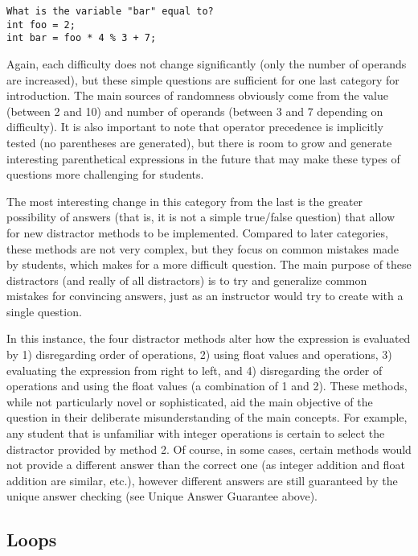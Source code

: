 \documentclass{article}
\begin{document}
\begin{lstlisting}
What is the variable "bar" equal to? 
int foo = 2; 
int bar = foo * 4 % 3 + 7; 
\end{lstlisting}

Again, each difficulty does not change significantly (only the number of operands are increased), but these simple questions are sufficient for one last category for introduction.
The main sources of randomness obviously come from the value (between 2 and 10) and number of operands (between 3 and 7 depending on difficulty). It is also important to note that
operator precedence is implicitly tested (no parentheses are generated), but there is room to grow and generate interesting parenthetical expressions in the future that may make
these types of questions more challenging for students. 

The most interesting change in this category from the last is the greater possibility of answers (that is, it is not a simple true/false question) that allow for new distractor methods to be implemented. Compared to later categories, these methods are not very complex, but they focus on common mistakes made by students, which makes for a more difficult question. The main
purpose of these distractors (and really of all distractors) is to try and generalize common mistakes for convincing answers, just as an instructor would try to create with a single question. 

In this instance, the four distractor methods alter how the expression is evaluated by 1) disregarding order of operations, 2) using float values and operations, 3) evaluating the expression from
right to left, and 4) disregarding the order of operations and using the float values (a combination of 1 and 2). These methods, while not particularly novel or sophisticated, aid the main objective 
of the question in their deliberate misunderstanding of the main concepts. For example, any student that is unfamiliar with integer operations is certain to select the distractor provided by method 2. Of course, in some cases, certain methods would not provide a different answer than the correct one (as integer addition and float addition are similar, etc.), however different answers are still guaranteed by the unique answer checking (see Unique Answer Guarantee above).

\subsection{Loops}
\end{document}
